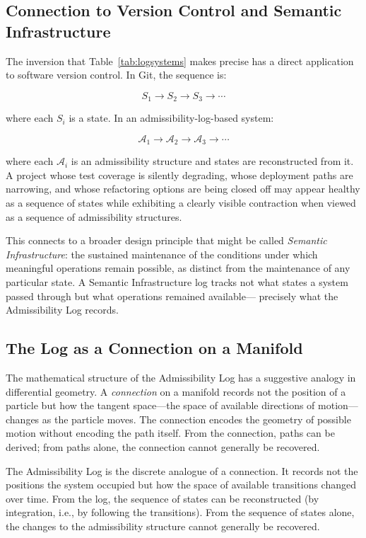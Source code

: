 \documentclass[12pt, a4paper]{article}
\theoremstyle{plain}
\theoremstyle{definition}
\theoremstyle{remark}
\begin{document}
\subsection{Connection to Version Control and Semantic Infrastructure}

The inversion that Table~\ref{tab:logsystems} makes precise has a direct
application to software version control. In Git, the sequence is:

$$S_1 \to S_2 \to S_3 \to \cdots$$

where each $S_i$ is a state. In an admissibility-log-based system:

$$\mathcal{A}_1 \to \mathcal{A}_2 \to \mathcal{A}_3 \to \cdots$$

where each $\mathcal{A}_i$ is an admissibility structure and states are
reconstructed from it. A project whose test coverage is silently degrading,
whose deployment paths are narrowing, and whose refactoring options are being
closed off may appear healthy as a sequence of states while exhibiting a
clearly visible contraction when viewed as a sequence of admissibility
structures.

This connects to a broader design principle that might be called
\emph{Semantic Infrastructure}: the sustained maintenance of the conditions
under which meaningful operations remain possible, as distinct from the
maintenance of any particular state. A Semantic Infrastructure log tracks not
what states a system passed through but what operations remained available---
precisely what the Admissibility Log records.

\subsection{The Log as a Connection on a Manifold}

The mathematical structure of the Admissibility Log has a suggestive analogy
in differential geometry. A \emph{connection} on a manifold records not the
position of a particle but how the tangent space---the space of available
directions of motion---changes as the particle moves. The connection encodes
the geometry of possible motion without encoding the path itself. From the
connection, paths can be derived; from paths alone, the connection cannot
generally be recovered.

The Admissibility Log is the discrete analogue of a connection. It records
not the positions the system occupied but how the space of available transitions
changed over time. From the log, the sequence of states can be reconstructed
(by integration, i.e., by following the transitions). From the sequence of
states alone, the changes to the admissibility structure cannot generally be
recovered.
\end{document}
